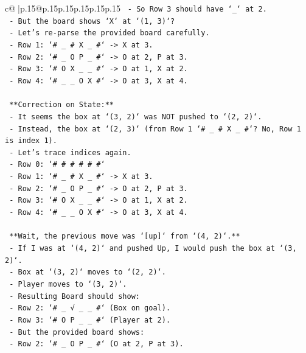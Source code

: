 \documentclass{article}
\begin{document}
{\begin{supertabular}{c@{$\;$}|p{.15\linewidth}@{}p{.15\linewidth}p{.15\linewidth}p{.15\linewidth}p{.15\linewidth}p{.15\linewidth}}
{{{\texttt{      {-} So Row 3 should have `\_` at 2.} \\
\texttt{      {-} But the board shows `X` at `(1, 3)`?} \\
\texttt{      {-} Let's re{-}parse the provided board carefully.} \\
\texttt{      {-} Row 1: `\# \_ \# X \_ \#` {-}> X at 3.} \\
\texttt{      {-} Row 2: `\# \_ O P \_ \#` {-}> O at 2, P at 3.} \\
\texttt{      {-} Row 3: `\# O X \_ \_ \#` {-}> O at 1, X at 2.} \\
\texttt{      {-} Row 4: `\# \_ \_ O X \#` {-}> O at 3, X at 4.} \\
\\ 
\texttt{      **Correction on State:**} \\
\texttt{      {-} It seems the box at `(3, 2)` was NOT pushed to `(2, 2)`.} \\
\texttt{      {-} Instead, the box at `(2, 3)` (from Row 1 `\# \_ \# X \_ \#`? No, Row 1 is index 1).} \\
\texttt{      {-} Let's trace indices again.} \\
\texttt{      {-} Row 0: `\# \# \# \# \# \#`} \\
\texttt{      {-} Row 1: `\# \_ \# X \_ \#` {-}> X at 3.} \\
\texttt{      {-} Row 2: `\# \_ O P \_ \#` {-}> O at 2, P at 3.} \\
\texttt{      {-} Row 3: `\# O X \_ \_ \#` {-}> O at 1, X at 2.} \\
\texttt{      {-} Row 4: `\# \_ \_ O X \#` {-}> O at 3, X at 4.} \\
\\ 
\texttt{      **Wait, the previous move was `{[}up{]}` from `(4, 2)`.**} \\
\texttt{      {-} If I was at `(4, 2)` and pushed Up, I would push the box at `(3, 2)`.} \\
\texttt{      {-} Box at `(3, 2)` moves to `(2, 2)`.} \\
\texttt{      {-} Player moves to `(3, 2)`.} \\
\texttt{      {-} Resulting Board should show:} \\
\texttt{        {-} Row 2: `\# \_ √ \_ \_ \#` (Box on goal).} \\
\texttt{        {-} Row 3: `\# O P \_ \_ \#` (Player at 2).} \\
\texttt{      {-} But the provided board shows:} \\
\texttt{        {-} Row 2: `\# \_ O P \_ \#` (O at 2, P at 3).} \\
}}}
\end{supertabular}}
\end{document}
